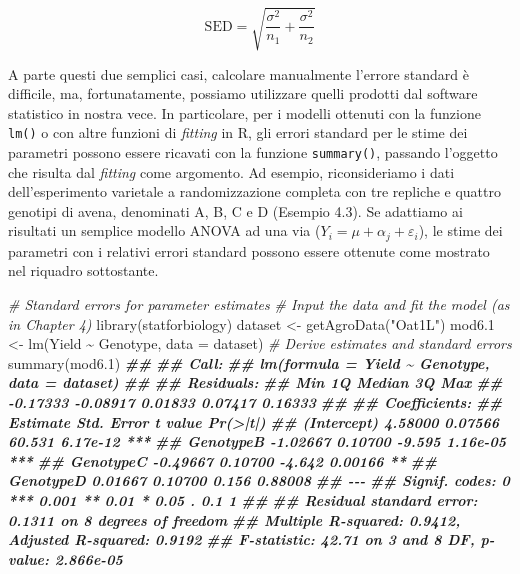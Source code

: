\documentclass[
  12pt,
]{book}
\newenvironment{Shaded}{\begin{snugshade}}{\end{snugshade}}
\newcommand{\AttributeTok}[1]{\textcolor[rgb]{0.77,0.63,0.00}{#1}}
\newcommand{\CommentTok}[1]{\textcolor[rgb]{0.56,0.35,0.01}{\textit{#1}}}
\newcommand{\DocumentationTok}[1]{\textcolor[rgb]{0.56,0.35,0.01}{\textbf{\textit{#1}}}}
\newcommand{\FloatTok}[1]{\textcolor[rgb]{0.00,0.00,0.81}{#1}}
\newcommand{\FunctionTok}[1]{\textcolor[rgb]{0.00,0.00,0.00}{#1}}
\newcommand{\NormalTok}[1]{#1}
\newcommand{\OtherTok}[1]{\textcolor[rgb]{0.56,0.35,0.01}{#1}}
\newcommand{\SpecialCharTok}[1]{\textcolor[rgb]{0.00,0.00,0.00}{#1}}
\newcommand{\StringTok}[1]{\textcolor[rgb]{0.31,0.60,0.02}{#1}}
\begin{document}
\[\textrm{SED}  =  \sqrt{ \frac{\sigma^2}{n_1} + \frac{\sigma^2}{n_2}}\]

A parte questi due semplici casi, calcolare manualmente l'errore standard è difficile, ma, fortunatamente, possiamo utilizzare quelli prodotti dal software statistico in nostra vece. In particolare, per i modelli ottenuti con la funzione \texttt{lm()} o con altre funzioni di \emph{fitting} in R, gli errori standard per le stime dei parametri possono essere ricavati con la funzione \texttt{summary()}, passando l'oggetto che risulta dal \emph{fitting} come argomento. Ad esempio, riconsideriamo i dati dell'esperimento varietale a randomizzazione completa con tre repliche e quattro genotipi di avena, denominati A, B, C e D (Esempio 4.3). Se adattiamo ai risultati un semplice modello ANOVA ad una via (\(Y_i = \mu + \alpha_j + \varepsilon_i\)), le stime dei parametri con i relativi errori standard possono essere ottenute come mostrato nel riquadro sottostante.

\begin{Shaded}
\begin{Highlighting}[]
\CommentTok{\# Standard errors for parameter estimates}
\CommentTok{\# Input the data and fit the model (as in Chapter 4)}
\FunctionTok{library}\NormalTok{(statforbiology)}
\NormalTok{dataset }\OtherTok{\textless{}{-}} \FunctionTok{getAgroData}\NormalTok{(}\StringTok{"Oat1L"}\NormalTok{)}
\NormalTok{mod6}\FloatTok{.1} \OtherTok{\textless{}{-}} \FunctionTok{lm}\NormalTok{(Yield }\SpecialCharTok{\textasciitilde{}}\NormalTok{ Genotype, }\AttributeTok{data =}\NormalTok{ dataset)}
\CommentTok{\# Derive estimates and standard errors}
\FunctionTok{summary}\NormalTok{(mod6}\FloatTok{.1}\NormalTok{)}
\DocumentationTok{\#\# }
\DocumentationTok{\#\# Call:}
\DocumentationTok{\#\# lm(formula = Yield \textasciitilde{} Genotype, data = dataset)}
\DocumentationTok{\#\# }
\DocumentationTok{\#\# Residuals:}
\DocumentationTok{\#\#      Min       1Q   Median       3Q      Max }
\DocumentationTok{\#\# {-}0.17333 {-}0.08917  0.01833  0.07417  0.16333 }
\DocumentationTok{\#\# }
\DocumentationTok{\#\# Coefficients:}
\DocumentationTok{\#\#             Estimate Std. Error t value Pr(\textgreater{}|t|)    }
\DocumentationTok{\#\# (Intercept)  4.58000    0.07566  60.531 6.17e{-}12 ***}
\DocumentationTok{\#\# GenotypeB   {-}1.02667    0.10700  {-}9.595 1.16e{-}05 ***}
\DocumentationTok{\#\# GenotypeC   {-}0.49667    0.10700  {-}4.642  0.00166 ** }
\DocumentationTok{\#\# GenotypeD    0.01667    0.10700   0.156  0.88008    }
\DocumentationTok{\#\# {-}{-}{-}}
\DocumentationTok{\#\# Signif. codes:  0 \textquotesingle{}***\textquotesingle{} 0.001 \textquotesingle{}**\textquotesingle{} 0.01 \textquotesingle{}*\textquotesingle{} 0.05 \textquotesingle{}.\textquotesingle{} 0.1 \textquotesingle{} \textquotesingle{} 1}
\DocumentationTok{\#\# }
\DocumentationTok{\#\# Residual standard error: 0.1311 on 8 degrees of freedom}
\DocumentationTok{\#\# Multiple R{-}squared:  0.9412, Adjusted R{-}squared:  0.9192 }
\DocumentationTok{\#\# F{-}statistic: 42.71 on 3 and 8 DF,  p{-}value: 2.866e{-}05}
\end{Highlighting}
\end{Shaded}
\end{document}
